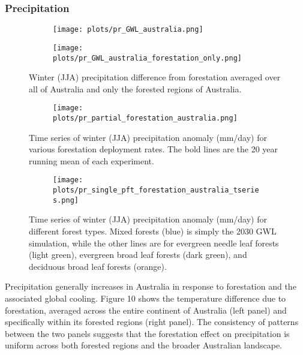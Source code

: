 \documentclass[]{article}
\begin{document}
\subsubsection{Precipitation}

\begin{figure}[H]
    \centering
    \begin{subfigure}[b]{0.4\linewidth}
        \texttt{[image: plots/pr\_GWL\_australia.png]}
    \end{subfigure}
    \begin{subfigure}[b]{0.4\linewidth}
        \texttt{[image: plots/pr\_GWL\_australia\_forestation\_only.png]}
    \end{subfigure}
    \caption{Winter (JJA) precipitation difference from forestation averaged over all of Australia and only the forested regions of Australia.}
    \label{fig:pr_australia_timeseries}
\end{figure}

\begin{figure}[H]
    \centering
    \begin{subfigure}[b]{\linewidth}
        \texttt{[image: plots/pr\_partial\_forestation\_australia.png]}
    \end{subfigure}
    \caption{Time series of winter (JJA) precipitation anomaly (mm/day) for various forestation deployment rates. The bold lines are the 20 year running mean of each experiment.}
    \label{fig:pr_australia_partial}
\end{figure}

\begin{figure}[H]
    \centering
    \begin{subfigure}[b]{\linewidth}
        \texttt{[image: plots/pr\_single\_pft\_forestation\_australia\_tseries.png]}
    \end{subfigure}
    \caption{Time series of winter (JJA) precipitation anomaly (mm/day) for different forest types. Mixed forests (blue) is simply the 2030 GWL simulation, while the other lines are for evergreen needle leaf forests (light green), evergreen broad leaf forests (dark green), and deciduous broad leaf forests (orange).}
    \label{fig:pr_australia_single}
\end{figure}

Precipitation generally increases in Australia in response to forestation and the associated global cooling.
Figure 10 shows the temperature difference due to forestation, averaged across the entire continent of Australia (left panel) and specifically within its forested regions (right panel).
The consistency of patterns between the two panels suggests that the forestation effect on precipitation is uniform across both forested regions and the broader Australian landscape.
\end{document}
